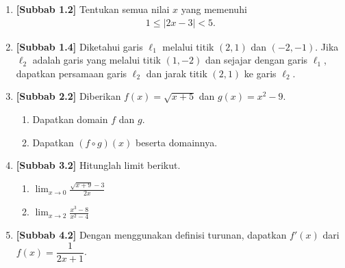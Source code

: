 \documentclass[10pt,openany,a4paper]{article}
\theoremstyle{definition}
\theoremstyle{definition}
\theoremstyle{plain}
\begin{document}
\begin{enumerate}
    \item \textbf{[Subbab 1.2]} Tentukan semua nilai $x$ yang memenuhi
    \begin{align*}
        1\leq|2x-3|<5.
    \end{align*}

    \item \textbf{[Subbab 1.4]} Diketahui garis $\ell_1$ melalui titik $(2,1)$ dan $(-2,-1)$. Jika $\ell_2$ adalah garis yang melalui titik $(1,-2)$ dan sejajar dengan garis $\ell_1$, dapatkan persamaan garis $\ell_2$ dan jarak titik $(2,1)$ ke garis $\ell_2$.

    \item \textbf{[Subbab 2.2]} Diberikan $f(x)=\sqrt{x+5}$ dan $g(x)=x^2-9$.
    \begin{enumerate}
        \item Dapatkan domain $f$ dan $g$.
        \item Dapatkan $(f\circ g)(x)$ beserta domainnya.
    \end{enumerate}

    \item \textbf{[Subbab 3.2]} Hitunglah limit berikut.
    \begin{enumerate}
        \item $\displaystyle\lim_{x\to 0}\frac{\sqrt{x+9}-3}{2x}$
        \item $\displaystyle\lim_{x\to 2}\frac{x^3-8}{x^2-4}$
    \end{enumerate}

    \item \textbf{[Subbab 4.2]} Dengan menggunakan definisi turunan, dapatkan $f'(x)$ dari $f(x)=\dfrac{1}{2x+1}$.
\end{enumerate}

\newpage
\end{document}

